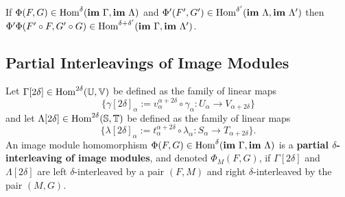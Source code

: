 \begin{lemma}\label{lem:composition}
  If $\Phi(F, G)\in\mathrm{Hom}^\delta(\mathbf{im}~\Gamma, \mathbf{im}~\Lambda)$ and $\Phi'(F', G')\in\mathrm{Hom}^{\delta'}(\mathbf{im}~\Lambda, \mathbf{im}~\Lambda')$ then $\Phi'\Phi(F'\circ F, G'\circ G)\in\mathrm{Hom}^{\delta+\delta'}(\mathbf{im}~\Gamma,\mathbf{im}~\Lambda')$.
\end{lemma}
%

\subsection{Partial Interleavings of Image Modules}

Let $\Gamma[2\delta]\in\mathrm{Hom}^{2\delta}(\mathbb{U},\mathbb{V})$ be defined as the family of linear maps
\[\{\gamma[2\delta]_\alpha := v_{\alpha}^{\alpha+2\delta}\circ\gamma_{\alpha} : U_\alpha\to V_{\alpha+2\delta}\}\]
and let $\Lambda[2\delta]\in\mathrm{Hom}^{2\delta}(\mathbb{S},\mathbb{T})$ be defined as the family of linear maps
\[\{\lambda[2\delta]_\alpha := t_{\alpha}^{\alpha+2\delta}\circ\lambda_\alpha : S_\alpha\to T_{\alpha+2\delta}\}.\]
An image module homomorphism $\Phi(F, G)\in\mathrm{Hom}^\delta(\mathbf{im}~\Gamma,\mathbf{im}~\Lambda)$ is a \textbf{partial $\delta$-interleaving of image modules}, and denoted $\Phi_M(F, G)$, if $\Gamma[2\delta]$ and $\Lambda[2\delta]$ are left $\delta$-interleaved by a pair $(F, M)$ and right $\delta$-interleaved by the pair $(M, G)$.

